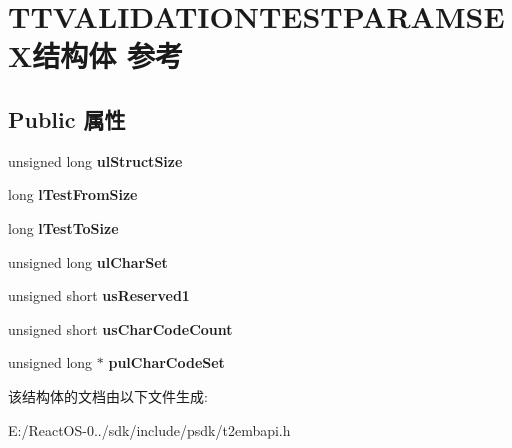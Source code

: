 \hypertarget{struct_t_t_v_a_l_i_d_a_t_i_o_n_t_e_s_t_p_a_r_a_m_s_e_x}{}\section{T\+T\+V\+A\+L\+I\+D\+A\+T\+I\+O\+N\+T\+E\+S\+T\+P\+A\+R\+A\+M\+S\+E\+X结构体 参考}
\label{struct_t_t_v_a_l_i_d_a_t_i_o_n_t_e_s_t_p_a_r_a_m_s_e_x}
\subsection*{Public 属性}
\begin{DoxyCompactItemize}
\item 
\mbox{\label{struct_t_t_v_a_l_i_d_a_t_i_o_n_t_e_s_t_p_a_r_a_m_s_e_x_afaebe1fabfe85578c8aa6c76b9315078}} 
unsigned long {\bfseries ul\+Struct\+Size}
\item 
\mbox{\label{struct_t_t_v_a_l_i_d_a_t_i_o_n_t_e_s_t_p_a_r_a_m_s_e_x_aab3cb2c6f20afc9cfcc4ba1246f653da}} 
long {\bfseries l\+Test\+From\+Size}
\item 
\mbox{\label{struct_t_t_v_a_l_i_d_a_t_i_o_n_t_e_s_t_p_a_r_a_m_s_e_x_a0d78e8215a1eccb0181bdb0932b63802}} 
long {\bfseries l\+Test\+To\+Size}
\item 
\mbox{\label{struct_t_t_v_a_l_i_d_a_t_i_o_n_t_e_s_t_p_a_r_a_m_s_e_x_a6cd26639517fbd5151ad82a7237be37a}} 
unsigned long {\bfseries ul\+Char\+Set}
\item 
\mbox{\label{struct_t_t_v_a_l_i_d_a_t_i_o_n_t_e_s_t_p_a_r_a_m_s_e_x_a358d620d35af7be7b6d8d3a9a2bf0a15}} 
unsigned short {\bfseries us\+Reserved1}
\item 
\mbox{\label{struct_t_t_v_a_l_i_d_a_t_i_o_n_t_e_s_t_p_a_r_a_m_s_e_x_afc71045f6d11c7950584ef3bbd899faf}} 
unsigned short {\bfseries us\+Char\+Code\+Count}
\item 
\mbox{\label{struct_t_t_v_a_l_i_d_a_t_i_o_n_t_e_s_t_p_a_r_a_m_s_e_x_a403169746e8b67b88eaad57c69fcf56d}} 
unsigned long $\ast$ {\bfseries pul\+Char\+Code\+Set}
\end{DoxyCompactItemize}


该结构体的文档由以下文件生成\+:\begin{DoxyCompactItemize}
\item 
E\+:/\+React\+O\+S-\/0../sdk/include/psdk/t2embapi.\+h\end{DoxyCompactItemize}
